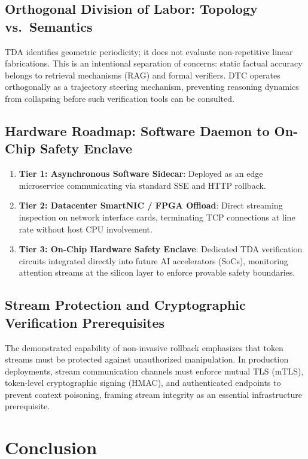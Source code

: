 \documentclass[11pt,a4paper]{article}
\begin{document}
\subsection{Orthogonal Division of Labor: Topology vs.\ Semantics}
TDA identifies geometric periodicity; it does not evaluate non-repetitive linear fabrications. This is an intentional separation of concerns: static factual accuracy belongs to retrieval mechanisms (RAG) and formal verifiers. DTC operates orthogonally as a trajectory steering mechanism, preventing reasoning dynamics from collapsing before such verification tools can be consulted.

\subsection{Hardware Roadmap: Software Daemon to On-Chip Safety Enclave}
\begin{enumerate}
    \item \textbf{Tier 1: Asynchronous Software Sidecar}: Deployed as an edge microservice communicating via standard SSE and HTTP rollback.
    \item \textbf{Tier 2: Datacenter SmartNIC / FPGA Offload}: Direct streaming inspection on network interface cards, terminating TCP connections at line rate without host CPU involvement.
    \item \textbf{Tier 3: On-Chip Hardware Safety Enclave}: Dedicated TDA verification circuits integrated directly into future AI accelerators (SoCs), monitoring attention streams at the silicon layer to enforce provable safety boundaries.
\end{enumerate}

\subsection{Stream Protection and Cryptographic Verification Prerequisites}
The demonstrated capability of non-invasive rollback emphasizes that token streams must be protected against unauthorized manipulation. In production deployments, stream communication channels must enforce mutual TLS (mTLS), token-level cryptographic signing (HMAC), and authenticated endpoints to prevent context poisoning, framing stream integrity as an essential infrastructure prerequisite.

\section{Conclusion}
\end{document}
